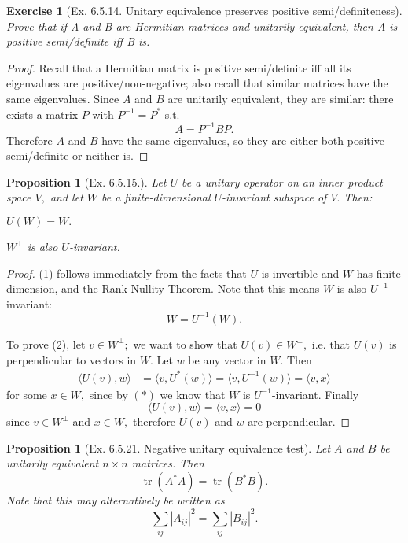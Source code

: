 \documentclass[20pt]{extarticle}
\let\oldBeginEnumerate=\enumerate
\let\oldEndEnumerate=\endenumerate
\renewenvironment{enumerate}{
\oldBeginEnumerate
  \setlength{\itemsep}{0pt}
  \setlength{\parskip}{0pt}
  \setlength{\parsep}{0pt}
}{\oldEndEnumerate}
\theoremstyle{plain}
\newtheorem{proposition}[theorem]{Proposition}
\newtheorem{exercise}[theorem]{Exercise}
\theoremstyle{definition}
\theoremstyle{remark}
\DeclareMathOperator{\tr}{tr}
\newcommand{\0}{\varnothing}
\newcommand{\<}{\langle}
\renewcommand{\>}{\rangle}
\begin{document}
\begin{exercise}[Ex. 6.5.14. Unitary equivalence preserves positive semi/definiteness]
Prove that if A and B are Hermitian matrices and unitarily equivalent, then A is positive semi/definite iff B is.
\end{exercise}

\begin{proof}
Recall that a Hermitian matrix is positive semi/definite iff all its eigenvalues are positive/non-negative; also recall that similar matrices have the same eigenvalues. Since $ A $ and $ B $ are unitarily equivalent, they are similar: there exists a matrix $ P $ with $ P^{-1} = P^{*} $ s.t. $$
  A = P^{-1} B P.
$$
Therefore $ A $ and $ B $ have the same eigenvalues, so they are either both positive semi/definite or neither is.
\end{proof}

\begin{proposition}[Ex. 6.5.15.]
Let $ U $ be a unitary operator on an inner product space $ V, $ and let $ W $ be a finite-dimensional $ U $-invariant subspace of $ V. $ Then:
\begin{enumerate}
  \item $ U(W) = W. $
  \item $ W^\perp $ is also $ U $-invariant.
\end{enumerate}
\end{proposition}

\begin{proof}
(1) follows immediately from the facts that $ U $ is invertible and $ W $ has finite dimension, and the Rank-Nullity Theorem. Note that this means $ W $ is also $ U^{-1} $-invariant: \[
W = U^{-1} (W).\tag{$ * $}
\]

To prove (2), let $ v \in W^{\perp};$ we want to show that $ U(v) \in W^\perp, $ i.e. that $ U(v) $ is perpendicular to vectors in $ W. $ Let $ w $ be any vector in $ W. $ Then \begin{align*}
\< U(v), w \> &= \< v, U^*(w) \> = \< v, U^{-1}(w) \> = \< v, x \>
\end{align*}
for some $ x \in W, $ since by $ (*) $ we know that $ W $ is $ U^{-1} $-invariant. Finally \[
  \< U(v), w \> = \< v, x \> = 0
\]
since $ v \in W^{\perp} $ and $ x \in W, $ therefore $ U(v) $ and $ w $ are perpendicular.
\end{proof}

\begin{proposition}[Ex. 6.5.21. Negative unitary equivalence test]
Let $ A $  and $ B $ be unitarily equivalent $ n\times n $ matrices. Then \[
\tr(A^* A) = \tr(B^* B).
\]
Note that this may alternatively be written as \[
\sum_{ij} | A_{ij} |^2 = \sum_{ij} | B_{ij} |^2.
\]
\end{proposition}
\end{document}
